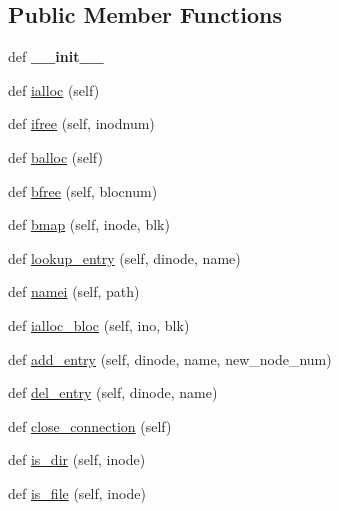 \subsection*{Public Member Functions}
\begin{DoxyCompactItemize}
\item 
\hypertarget{classminixfs_1_1minix__file__system_ac775ee34451fdfa742b318538164070e}{}def {\bfseries \+\_\+\+\_\+init\+\_\+\+\_\+}\label{classminixfs_1_1minix__file__system_ac775ee34451fdfa742b318538164070e}

\item 
def \hyperlink{classminixfs_1_1minix__file__system_ac753955974e9b3614eec2d1cf8b93639}{ialloc} (self)
\item 
def \hyperlink{classminixfs_1_1minix__file__system_a55ed46422438bf8eab80de66acd378b1}{ifree} (self, inodnum)
\item 
def \hyperlink{classminixfs_1_1minix__file__system_a51021b42e8af995e5ac74979a7aee885}{balloc} (self)
\item 
def \hyperlink{classminixfs_1_1minix__file__system_a54f50fa051d1d77d753ce8688ed7e6ba}{bfree} (self, blocnum)
\item 
def \hyperlink{classminixfs_1_1minix__file__system_a07b52e5651158cb195a01a5e6234c996}{bmap} (self, inode, blk)
\item 
def \hyperlink{classminixfs_1_1minix__file__system_adf96ecc47840b99f288a32cd06e3abd2}{lookup\+\_\+entry} (self, dinode, name)
\item 
def \hyperlink{classminixfs_1_1minix__file__system_a76146b8729e2a37f75ee55908bee4274}{namei} (self, path)
\item 
def \hyperlink{classminixfs_1_1minix__file__system_a6a0b6aa1991aeb4c025efd78b8ef91b3}{ialloc\+\_\+bloc} (self, ino, blk)
\item 
def \hyperlink{classminixfs_1_1minix__file__system_a166b0076ab0da67e19ff5df78a3d0993}{add\+\_\+entry} (self, dinode, name, new\+\_\+node\+\_\+num)
\item 
def \hyperlink{classminixfs_1_1minix__file__system_af0e1a37032a14afc0f39854b1a9a3b9e}{del\+\_\+entry} (self, dinode, name)
\item 
def \hyperlink{classminixfs_1_1minix__file__system_a000dc714be8532702febb6be755908dc}{close\+\_\+connection} (self)
\item 
def \hyperlink{classminixfs_1_1minix__file__system_ac93c361341836b72c9dce468707c2705}{is\+\_\+dir} (self, inode)
\item 
def \hyperlink{classminixfs_1_1minix__file__system_a293eb36362ad3007d5091e16e2fe6550}{is\+\_\+file} (self, inode)

\end{DoxyCompactItemize}
